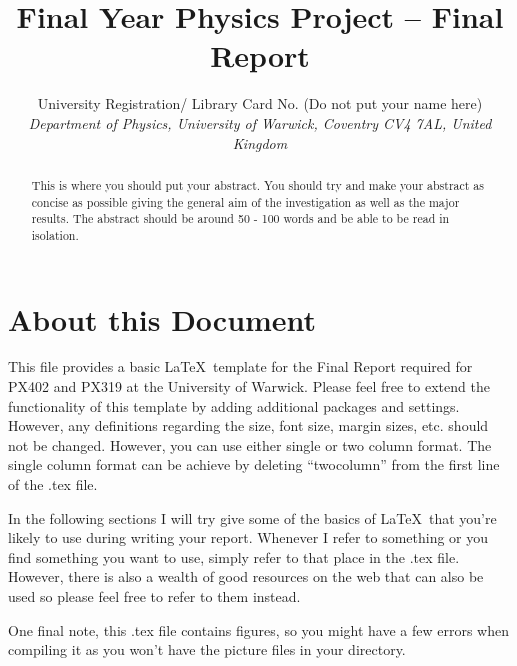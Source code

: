 \documentclass[a4paper,12pt, notitlepage]{article}
\begin{document}
\title{\textbf{\large{Final Year Physics Project – Final Report}}}

\author{\normalsize{University Registration/ Library Card No. (Do not put your name here)} \\
        \small\textit{
        Department of Physics, University of Warwick,
        Coventry CV4 7AL, United Kingdom}}
\date{}


\maketitle 
\vspace{-10mm}

\begin{abstract} 
\noindent
This is where you should put your abstract. You should try and make your abstract as concise as possible giving the general aim of the investigation as well as the major results. The abstract should be around 50 - 100 words and be able to be read in isolation.  
\end{abstract}
\vspace{6mm}
 

\section{About this Document}
This file provides a basic \LaTeX\ template for the Final Report required for PX402 and PX319 at the University of Warwick. Please feel free to extend the functionality of this template by adding additional packages and settings. However, any definitions regarding the size, font size, margin sizes, etc. should not be changed. However, you can use either single or two column format. The single column format can be achieve by deleting ``twocolumn'' from the first line of the .tex file.

In the following sections I will try give some of the basics of \LaTeX\ that you're likely to use during writing your report. Whenever I refer to something or you find something you want to use, simply refer to that place in the .tex file. However, there is also a wealth of good resources on the web that can also be used so please feel free to refer to them instead.

One final note, this .tex file contains figures, so you might have a few errors when compiling it as you won't have the  picture files in your directory.  
\end{document}
